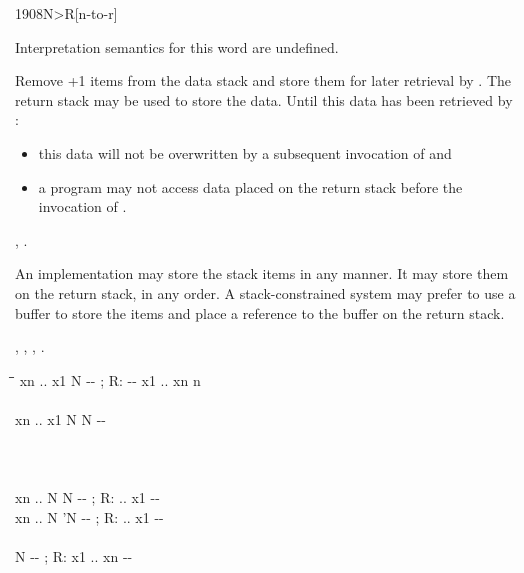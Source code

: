 \pagebreak
\begin{worddef}[NtoR]{1908}{N>R}[n-to-r]%

\interpret
	Interpretation semantics for this word are undefined.

\execute {} 

	Remove +1 items from the data stack and store them for later
	retrieval by . The return stack may be used to store the
	data. Until this data has been retrieved by :
	\begin{itemize}
	\item this data will not be overwritten by a subsequent invocation of
		 and
	\item a program may not access data placed on the return stack before
		the invocation of .
	\end{itemize} 

\see {},
	  .

	\begin{rationale}
		An implementation may store the stack items in any manner.  It may
		store them on the return stack, in any order.  A stack-constrained
		system may prefer to use a buffer to store the items and place a
		reference to the buffer on the return stack.

	\see {},
	  ,
	  , \linebreak
	  .
	\end{rationale}

	\begin{implement} %

		\begin{tabbing}
		\tab \= \tab \= \tab[11] \= \kill
		\word{:}             xn .. x1 N -{}- ; R: -{}- x1 .. xn n \\
		  \+ \\
			 \>\>  xn .. x1 N N -{}- \\
			 \+ \\
				 \- \\
			 \+ \\
				   \word{toR}  \> xn .. N N -{}- ; R: .. x1 -{}- \\
				 \>  xn .. N 'N -{}- ; R: .. x1 -{}- \- \\
		 \\
		 \>\>  N -{}- ; R: x1 .. xn -{}- \\
		  \word{toR}  \- \\
		\word{;}
		\end{tabbing}
	\end{implement}


\end{worddef}
